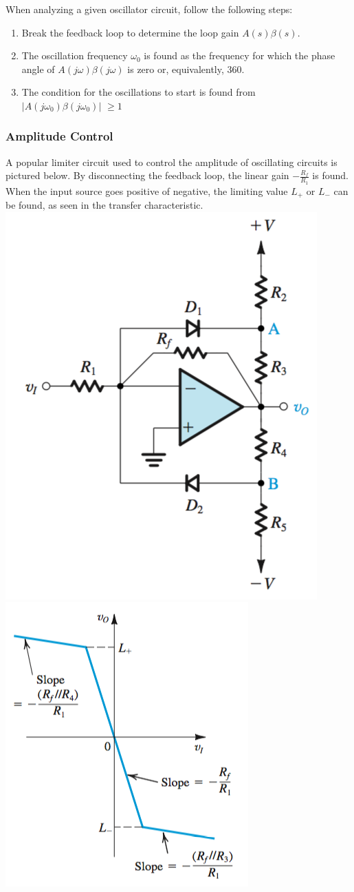 \documentclass[11pt]{article}
\begin{document}
    When analyzing a given oscillator circuit, follow the following steps:

    \begin{enumerate}
        \item Break the feedback loop to determine the loop gain $A(s)\beta(s)$.
        \item The oscillation frequency $\omega_0$ is found as the frequency for which the phase angle of $A(j\omega)\beta(j\omega)$ is zero or, equivalently, 360.
        \item The condition for the oscillations to start is found from \\
        $|A(j\omega_0)\beta(j\omega_0)|$ $\geq 1$
    \end{enumerate}
    \subsubsection{Amplitude Control}
    A popular limiter circuit used to control the amplitude of oscillating circuits is pictured below. By disconnecting the feedback loop, the linear gain $-\frac{R_f}{R_1}$ is found. When the input source goes positive of negative, the limiting value $L_+$ or $L_-$ can be found, as seen in the transfer characteristic. \\
    
    \includegraphics[width = 200 px]{lim} \includegraphics[width = 200 px]{lim-char} 
\end{document}
